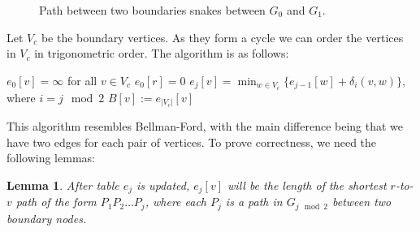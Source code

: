 \documentclass[11pt]{article}
\newtheorem{lemma}[theorem]{Lemma}
\begin{document}
\begin{figure}[!htb]
  \centering
  \hfil
  \caption{Path between two boundaries snakes between $G_0$ and $G_1$.}
  \label{fig:long-path}
\end{figure}

Let $V_c$ be the boundary vertices. As they form a cycle we can order the vertices in $V_c$ in trigonometric order. The algorithm is as follows:

\begin{algorithm}[!htb]
  \label{alg: bellman-ford}
  \begin{algorithmic}
    \State $e_0[v] = \infty$ for all $v \in V_c$
    \State $e_0[r] = 0$
        \State $e_j[v] = \min_{w\in V_c} \{e_{j-1}[w] + \delta_i(v,w)\}$, where $i = j \mod 2$
      \EndFor
    \EndFor
      \State $B[v] := e_{|V_c|}[v]$
    \EndFor
  \end{algorithmic}
\end{algorithm}

This algorithm resembles Bellman-Ford, with the main difference being that we have two edges for each pair of vertices. To prove correctness, we need the following lemmas:\\

\begin{lemma}
After table $e_j$ is updated, $e_j[v]$ will be the length of the shortest $r$-to-$v$ path of the form $P_1P_2\ldots P_j$, where each $P_j$ is a path in $G_{j\mod 2}$ between two boundary nodes.
\end{lemma}
\end{document}
